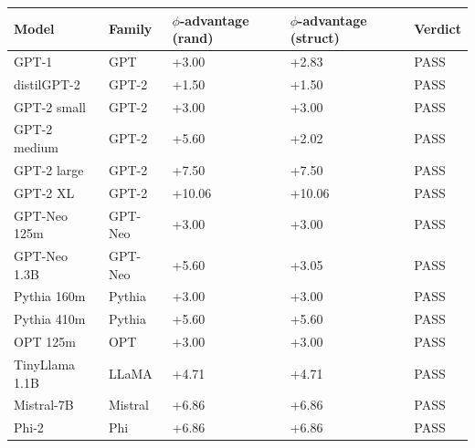 \documentclass[
  11pt,
  letterpaper,
]{article}
\begin{document}
\begin{longtable}[]{@{}
  >{\raggedright\arraybackslash}p{}
  >{\raggedright\arraybackslash}p{}
  >{\raggedright\arraybackslash}p{}
  >{\raggedright\arraybackslash}p{}
  >{\raggedright\arraybackslash}p{}@{}}
\toprule\noalign{}
\begin{minipage}[b]{\linewidth}\raggedright
Model
\end{minipage} & \begin{minipage}[b]{\linewidth}\raggedright
Family
\end{minipage} & \begin{minipage}[b]{\linewidth}\raggedright
\(\phi\)-advantage (rand)
\end{minipage} & \begin{minipage}[b]{\linewidth}\raggedright
\(\phi\)-advantage (struct)
\end{minipage} & \begin{minipage}[b]{\linewidth}\raggedright
Verdict
\end{minipage} \\
\midrule\noalign{}
\endhead
\bottomrule\noalign{}
\endlastfoot
GPT-1 & GPT & +3.00 & +2.83 & PASS \\
distilGPT-2 & GPT-2 & +1.50 & +1.50 & PASS \\
GPT-2 small & GPT-2 & +3.00 & +3.00 & PASS \\
GPT-2 medium & GPT-2 & +5.60 & +2.02 & PASS \\
GPT-2 large & GPT-2 & +7.50 & +7.50 & PASS \\
GPT-2 XL & GPT-2 & +10.06 & +10.06 & PASS \\
GPT-Neo 125m & GPT-Neo & +3.00 & +3.00 & PASS \\
GPT-Neo 1.3B & GPT-Neo & +5.60 & +3.05 & PASS \\
Pythia 160m & Pythia & +3.00 & +3.00 & PASS \\
Pythia 410m & Pythia & +5.60 & +5.60 & PASS \\
OPT 125m & OPT & +3.00 & +3.00 & PASS \\
TinyLlama 1.1B & LLaMA & +4.71 & +4.71 & PASS \\
Mistral-7B & Mistral & +6.86 & +6.86 & PASS \\
Phi-2 & Phi & +6.86 & +6.86 & PASS \\
\end{longtable}
\end{document}
